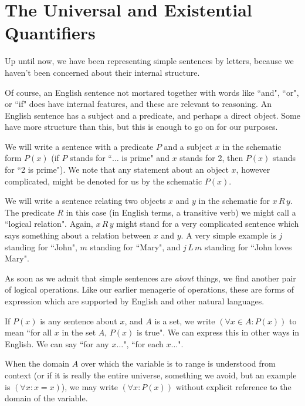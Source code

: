 \documentclass[12pt]{article}
\begin{document}
\newpage


\section{The Universal and Existential Quantifiers}

Up until now, we have been representing simple sentences by letters, because we haven't been concerned about their internal structure.

Of course, an English sentence not mortared together with words like ``and", ``or", or ``if" does have internal features, and these are relevant to reasoning.  An English sentence has a subject and a predicate, and perhaps a direct object.  Some have more structure than this, but this is enough to go on for our purposes.

We will write a sentence with a predicate $P$ and a subject $x$ in the schematic form $P(x)$ (if $P$ stands for ``$\ldots$ is prime" and $x$ stands for 2, then $P(x)$ stands for ``2 is prime").  We note that any statement about an object $x$, however complicated, might be denoted for us by the schematic $P(x)$.

We will write a sentence relating two objects $x$ and $y$ in the schematic for $x \, R \, y$.  The predicate $R$ in this case (in English terms, a transitive verb) we might call a ``logical relation".  Again, $x\,R\,y$ might stand for a very complicated sentence which says something about a relation between $x$ and $y$.  A very simple example is $j$ standing for ``John", $m$ standing for ``Mary", and $j\,L\,m$ standing for ``John loves Mary".

As soon as we admit that simple sentences are {\em about\/} things, we find another pair of logical operations.  Like our earlier menagerie of operations, these are forms of expression which are supported by English and other natural languages.

If $P(x)$ is any sentence about $x$, and $A$ is a set, we write $(\forall x \in A:P(x))$ to mean ``for all $x$ in the set $A$, $P(x)$ is true".
We can express this in other ways in English.  We can say ``for any $x\ldots$", ``for each $x\ldots$".

When the domain $A$ over which the variable is to range is understood from context (or if it is really the entire universe, something we avoid, but an example is $(\forall x:x=x)$), we may write
$(\forall x:P(x))$ without explicit reference to the domain of the variable.
\end{document}
